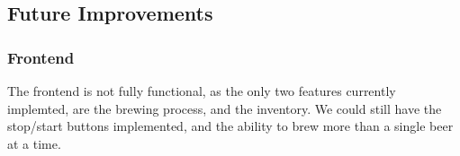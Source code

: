 \subsection{Future Improvements}
\subsubsection{Frontend}
The frontend is not fully functional, as the only two features currently implemted, are the brewing process, and the inventory.
We could still have the stop/start buttons implemented, and the ability to brew more than a single beer at a time.
